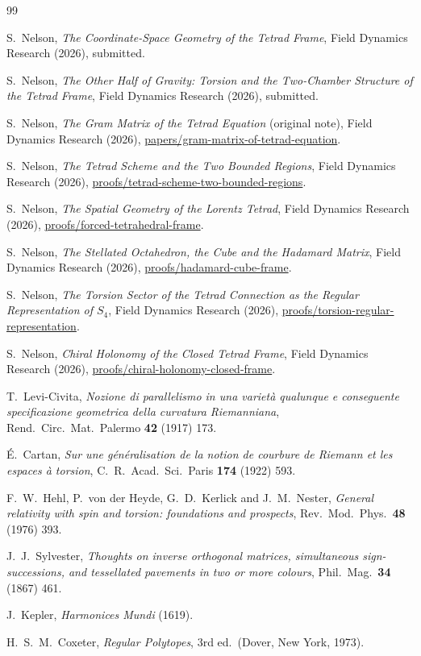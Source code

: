 \documentclass[twocolumn]{iopjournal}
\theoremstyle{definition}
\theoremstyle{remark}
\begin{document}
\sloppy
\begin{thebibliography}{99}

S.~Nelson,
\textit{The Coordinate-Space Geometry of the Tetrad Frame},
Field Dynamics Research (2026), submitted.

S.~Nelson,
\textit{The Other Half of Gravity: Torsion and the Two-Chamber
Structure of the Tetrad Frame},
Field Dynamics Research (2026), submitted.

S.~Nelson,
\textit{The Gram Matrix of the Tetrad Equation} (original note),
Field Dynamics Research (2026),
\url{papers/gram-matrix-of-tetrad-equation}.

S.~Nelson,
\textit{The Tetrad Scheme and the Two Bounded Regions},
Field Dynamics Research (2026),
\url{proofs/tetrad-scheme-two-bounded-regions}.

S.~Nelson,
\textit{The Spatial Geometry of the Lorentz Tetrad},
Field Dynamics Research (2026),
\url{proofs/forced-tetrahedral-frame}.

S.~Nelson,
\textit{The Stellated Octahedron, the Cube and the Hadamard Matrix},
Field Dynamics Research (2026),
\url{proofs/hadamard-cube-frame}.

S.~Nelson,
\textit{The Torsion Sector of the Tetrad Connection as the Regular
Representation of $S_4$},
Field Dynamics Research (2026),
\url{proofs/torsion-regular-representation}.

S.~Nelson,
\textit{Chiral Holonomy of the Closed Tetrad Frame},
Field Dynamics Research (2026),
\url{proofs/chiral-holonomy-closed-frame}.

T.~Levi-Civita,
\textit{Nozione di parallelismo in una variet\`{a} qualunque e
conseguente specificazione geometrica della curvatura Riemanniana},
Rend.\ Circ.\ Mat.\ Palermo \textbf{42} (1917) 173.

\'E.~Cartan,
\textit{Sur une g\'en\'eralisation de la notion de courbure de
Riemann et les espaces \`a torsion},
C.\ R.\ Acad.\ Sci.\ Paris \textbf{174} (1922) 593.

F.~W.~Hehl, P.~von der Heyde, G.~D.~Kerlick and J.~M.~Nester,
\textit{General relativity with spin and torsion: foundations and
prospects},
Rev.\ Mod.\ Phys.\ \textbf{48} (1976) 393.

J.~J.~Sylvester,
\textit{Thoughts on inverse orthogonal matrices, simultaneous
sign-successions, and tessellated pavements in two or more colours},
Phil.\ Mag.\ \textbf{34} (1867) 461.

J.~Kepler,
\textit{Harmonices Mundi} (1619).

H.~S.~M.~Coxeter,
\textit{Regular Polytopes},
3rd ed.\ (Dover, New York, 1973).

\end{thebibliography}
\end{document}
